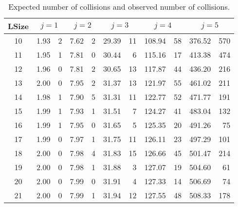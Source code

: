 

\begin {table}
\centering
\caption {Expected number of
          collisions and observed number of collisions.}
\label {tab:coll1}
\smallskip

\begin {tabular}{|c|@{\extracolsep{10pt}}rr|rr|rr|rr|rr|}
\hline
 LSize& \multicolumn{2}{c|}{$  j=1 $} & \multicolumn{2}{c|}{$  j=2 $} & \multicolumn{2}{c|}{$  j=3 $} & \multicolumn{2}{c|}{$  j=4 $} & \multicolumn{2}{c|}{$  j=5 $}  \\
\hline
 10 &     1.93 &        2 &     7.62 &        2 &    29.39 &       11 &   108.94 &       58 &   376.52 &      570 \\
 11 &     1.95 &        1 &     7.81 &        0 &    30.44 &        6 &   115.16 &       17 &   413.38 &      474 \\
 12 &     1.96 &        0 &     7.81 &        2 &    30.65 &       13 &   117.87 &       44 &   436.20 &      216 \\
 13 &     2.00 &        0 &     7.95 &        2 &    31.37 &       13 &   121.97 &       55 &   461.02 &      211 \\
 14 &     1.98 &        1 &     7.90 &        5 &    31.31 &       11 &   122.77 &       52 &   471.77 &      191 \\
 15 &     1.99 &        1 &     7.93 &        1 &    31.51 &        7 &   124.27 &       41 &   483.04 &      132 \\
 16 &     1.99 &        1 &     7.95 &        0 &    31.65 &        5 &   125.35 &       20 &   491.26 &       75 \\
 17 &     1.99 &        0 &     7.97 &        1 &    31.75 &       11 &   126.11 &       23 &   497.29 &      101 \\
 18 &     2.00 &        0 &     7.98 &        4 &    31.83 &       15 &   126.66 &       45 &   501.47 &      214 \\
 19 &     2.00 &        0 &     7.98 &        1 &    31.88 &        3 &   127.07 &       19 &   504.60 &       61 \\
 20 &     2.00 &        0 &     7.99 &        0 &    31.91 &        4 &   127.33 &       14 &   506.69 &       74 \\
 21 &     2.00 &        0 &     7.99 &        1 &    31.94 &       12 &   127.55 &       48 &   508.33 &      178 \\

\end{tabular}
\end{table}
